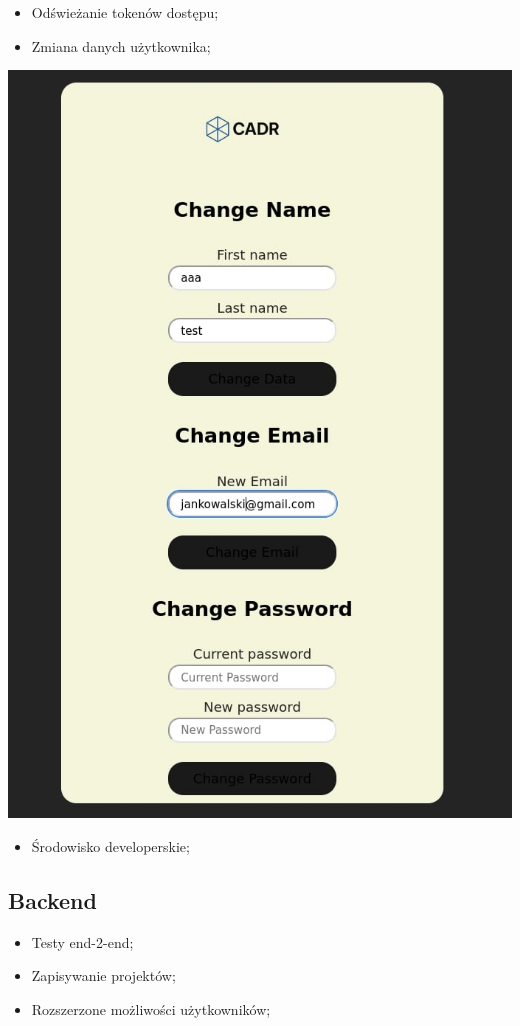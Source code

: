 \documentclass[11pt]{article}
\begin{document}
\begin{itemize}
\item Odświeżanie tokenów dostępu;
\item Zmiana danych użytkownika;
\end{itemize}
\begin{center}
\includegraphics[width=.9\linewidth]{./img/change.jpg}
\end{center}
\begin{itemize}
\item Środowisko developerskie;
\end{itemize}
\subsection{Backend}
\label{sec:orgd21c215}
\begin{itemize}
\item Testy end-2-end;
\item Zapisywanie projektów;
\item Rozszerzone możliwości użytkowników;
\end{itemize}
\end{document}
